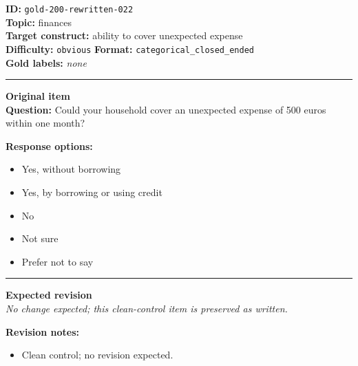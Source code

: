 \documentclass[10pt,a4paper]{article}
\newcommand{\sectionline}{\vspace{0.15em}\hrule\vspace{0.35em}}
\begin{document}
\begin{tcolorbox}[colframe=CleanGreen,colback=white,colbacktitle=CleanGreen!9,coltitle=black,title={Item 022\hfill Clean control}]
\textbf{ID:} \texttt{gold-200-rewritten-022}\\
\textbf{Topic:} finances\\
\textbf{Target construct:} ability to cover unexpected expense\\
\textbf{Difficulty:} \texttt{obvious} \quad \textbf{Format:} \texttt{categorical\_closed\_ended}\\
\textbf{Gold labels:} \textit{none}\\
\sectionline
\textbf{Original item}\\
\textbf{Question:} Could your household cover an unexpected expense of 500 euros within one month?
\par\textbf{Response options:}
\begin{itemize}
\item Yes, without borrowing
\item Yes, by borrowing or using credit
\item No
\item Not sure
\item Prefer not to say
\end{itemize}
\sectionline
\textbf{Expected revision}\\
\textit{No change expected; this clean-control item is preserved as written.}
\par\textbf{Revision notes:}
\begin{itemize}
\item Clean control; no revision expected.
\end{itemize}
\end{tcolorbox}
\end{document}

